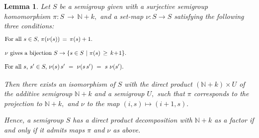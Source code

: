 \documentclass{amsart}
\newtheorem{lemma}[theorem]{Lemma}
\numberwithin{equation}{section}
\numberwithin{theorem}{section}
\newcommand{\N}{\mathbb{N}}
\begin{document}
\begin{lemma}\label{L.pi_&_nu}
Let $S$ be a semigroup given with a surjective semigroup
homomorphism $\pi: S\,\to\,\N\!+\!k,$ and a set-map $\nu: S\to S$
satisfying the following three conditions:
%
\begin{equation}\begin{minipage}[c]{35pc}\label{d.pi_nu(s)}
For all $s\in S,$ $\pi(\nu(s))\,=\,\pi(s) + 1.$
\end{minipage}\end{equation}
%
\begin{equation}\begin{minipage}[c]{35pc}\label{d.nu_bjctv}
$\nu$ gives a bijection $S\to \{s\in S\,\,|\,\,\pi(s)\,\geq\,k\!+\!1\}.$
\end{minipage}\end{equation}
%
\begin{equation}\begin{minipage}[c]{35pc}\label{d.nu_st}
For all $s,\,s'\in S,$ $\nu(s)\,s'~=~\nu(s\,s')~=~s\,\,\nu(s').$
\end{minipage}\end{equation}

Then there exists an isomorphism of $S$ with the direct product
$(\N\!+\!k)\times U$ of the additive
semigroup $\N\!+\!k$ and a semigroup
$U,$ such that $\pi$ corresponds to the projection to $\N\!+\!k,$ and
$\nu$ to the map $(i,s)\mapsto (i\!+\!1,s).$

Hence, a semigroup $S$ has a direct product decomposition with
$\N\!+\!k$ as a factor if
and only if it admits maps $\pi$ and $\nu$ as above.
\end{lemma}
\end{document}
